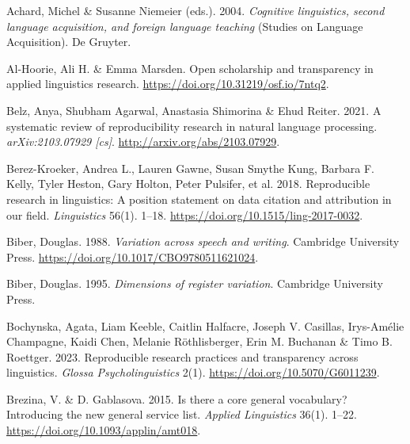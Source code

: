 \documentclass[
  letterpaper,
  DIV=11,
  numbers=noendperiod]{scrreprt}
\newlength{\cslhangindent}
\newenvironment{CSLReferences}[2] %
 {\begin{list}{}{%
  \setlength{\itemindent}{0pt}
  \setlength{\leftmargin}{0pt}
  \setlength{\parsep}{0pt}
  \ifodd #1
   \setlength{\leftmargin}{\cslhangindent}
   \setlength{\itemindent}{-1\cslhangindent}
  \fi
  \setlength{\itemsep}{#2\baselineskip}}}
 {\end{list}}
\begin{document}

\label{refs}
\begin{CSLReferences}{1}{0}
Achard, Michel \& Susanne Niemeier (eds.). 2004. \emph{Cognitive
linguistics, second language acquisition, and foreign language teaching}
(Studies on Language Acquisition). De Gruyter.

Al-Hoorie, Ali H. \& Emma Marsden. Open scholarship and transparency in
applied linguistics research.
\url{https://doi.org/10.31219/osf.io/7ntq2}.

Belz, Anya, Shubham Agarwal, Anastasia Shimorina \& Ehud Reiter. 2021. A
systematic review of reproducibility research in natural language
processing. \emph{arXiv:2103.07929 {[}cs{]}}.
\url{http://arxiv.org/abs/2103.07929}.

Berez-Kroeker, Andrea L., Lauren Gawne, Susan Smythe Kung, Barbara F.
Kelly, Tyler Heston, Gary Holton, Peter Pulsifer, et al. 2018.
Reproducible research in linguistics: A position statement on data
citation and attribution in our field. \emph{Linguistics} 56(1). 1--18.
\url{https://doi.org/10.1515/ling-2017-0032}.

Biber, Douglas. 1988. \emph{Variation across speech and writing}.
Cambridge University Press.
\url{https://doi.org/10.1017/CBO9780511621024}.

Biber, Douglas. 1995. \emph{Dimensions of register variation}. Cambridge
University Press.

Bochynska, Agata, Liam Keeble, Caitlin Halfacre, Joseph V. Casillas,
Irys-Amélie Champagne, Kaidi Chen, Melanie Röthlisberger, Erin M.
Buchanan \& Timo B. Roettger. 2023. Reproducible research practices and
transparency across linguistics. \emph{Glossa Psycholinguistics} 2(1).
\url{https://doi.org/10.5070/G6011239}.

Brezina, V. \& D. Gablasova. 2015. Is there a core general vocabulary?
Introducing the new general service list. \emph{Applied Linguistics}
36(1). 1--22. \url{https://doi.org/10.1093/applin/amt018}.


\end{CSLReferences}
\end{document}
